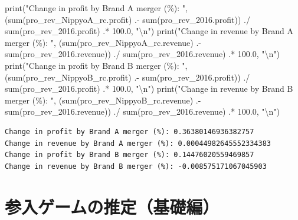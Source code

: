 \documentclass[
  letterpaper,
  DIV=11,
  numbers=noendperiod]{scrreprt}
\newenvironment{Shaded}{\begin{snugshade}}{\end{snugshade}}
\newcommand{\FloatTok}[1]{\textcolor[rgb]{0.68,0.00,0.00}{#1}}
\newcommand{\FunctionTok}[1]{\textcolor[rgb]{0.28,0.35,0.67}{#1}}
\newcommand{\NormalTok}[1]{\textcolor[rgb]{0.00,0.23,0.31}{#1}}
\newcommand{\OperatorTok}[1]{\textcolor[rgb]{0.37,0.37,0.37}{#1}}
\newcommand{\SpecialCharTok}[1]{\textcolor[rgb]{0.37,0.37,0.37}{#1}}
\newcommand{\StringTok}[1]{\textcolor[rgb]{0.13,0.47,0.30}{#1}}
\begin{document}
\begin{Shaded}
\begin{Highlighting}[]
\FunctionTok{print}\NormalTok{(}\StringTok{"Change in profit by Brand A merger (\%): "}\NormalTok{, (}\FunctionTok{sum}\NormalTok{(pro\_rev\_NippyoA\_rc.profit) }\OperatorTok{.{-}} \FunctionTok{sum}\NormalTok{(pro\_rev\_2016.profit)) }\OperatorTok{./} \FunctionTok{sum}\NormalTok{(pro\_rev\_2016.profit) }\OperatorTok{.*} \FloatTok{100.0}\NormalTok{, }\StringTok{"}\SpecialCharTok{\textbackslash{}n}\StringTok{"}\NormalTok{)}
\FunctionTok{print}\NormalTok{(}\StringTok{"Change in revenue by Brand A merger (\%): "}\NormalTok{, (}\FunctionTok{sum}\NormalTok{(pro\_rev\_NippyoA\_rc.revenue) }\OperatorTok{.{-}} \FunctionTok{sum}\NormalTok{(pro\_rev\_2016.revenue)) }\OperatorTok{./} \FunctionTok{sum}\NormalTok{(pro\_rev\_2016.revenue) }\OperatorTok{.*} \FloatTok{100.0}\NormalTok{, }\StringTok{"}\SpecialCharTok{\textbackslash{}n}\StringTok{"}\NormalTok{)}
\FunctionTok{print}\NormalTok{(}\StringTok{"Change in profit by Brand B merger (\%): "}\NormalTok{, (}\FunctionTok{sum}\NormalTok{(pro\_rev\_NippyoB\_rc.profit) }\OperatorTok{.{-}} \FunctionTok{sum}\NormalTok{(pro\_rev\_2016.profit)) }\OperatorTok{./} \FunctionTok{sum}\NormalTok{(pro\_rev\_2016.profit) }\OperatorTok{.*} \FloatTok{100.0}\NormalTok{, }\StringTok{"}\SpecialCharTok{\textbackslash{}n}\StringTok{"}\NormalTok{)}
\FunctionTok{print}\NormalTok{(}\StringTok{"Change in revenue by Brand B merger (\%): "}\NormalTok{, (}\FunctionTok{sum}\NormalTok{(pro\_rev\_NippyoB\_rc.revenue) }\OperatorTok{.{-}} \FunctionTok{sum}\NormalTok{(pro\_rev\_2016.revenue)) }\OperatorTok{./} \FunctionTok{sum}\NormalTok{(pro\_rev\_2016.revenue) }\OperatorTok{.*} \FloatTok{100.0}\NormalTok{, }\StringTok{"}\SpecialCharTok{\textbackslash{}n}\StringTok{"}\NormalTok{)}
\end{Highlighting}
\end{Shaded}

\begin{verbatim}
Change in profit by Brand A merger (%): 0.36380146936382757
Change in revenue by Brand A merger (%): 0.00044982645552334383
Change in profit by Brand B merger (%): 0.14476020559469857
Change in revenue by Brand B merger (%): -0.008575171067045903
\end{verbatim}


\hypertarget{ux53c2ux5165ux30b2ux30fcux30e0ux306eux63a8ux5b9aux57faux790eux7de8}{%
\chapter{参入ゲームの推定（基礎編）}\label{ux53c2ux5165ux30b2ux30fcux30e0ux306eux63a8ux5b9aux57faux790eux7de8}}
\end{document}
